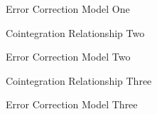 \documentclass[xcolor=dvipsnames]{beamer}
\begin{document}
\begin{frame}{Error Correction Model One}

\end{frame}


\begin{frame}{Cointegration Relationship Two}
\end{frame}


\begin{frame}{Error Correction Model Two}
\end{frame}


\begin{frame}{Cointegration Relationship Three}
\end{frame}


\begin{frame}{Error Correction Model Three}
\end{frame}
\end{document}
